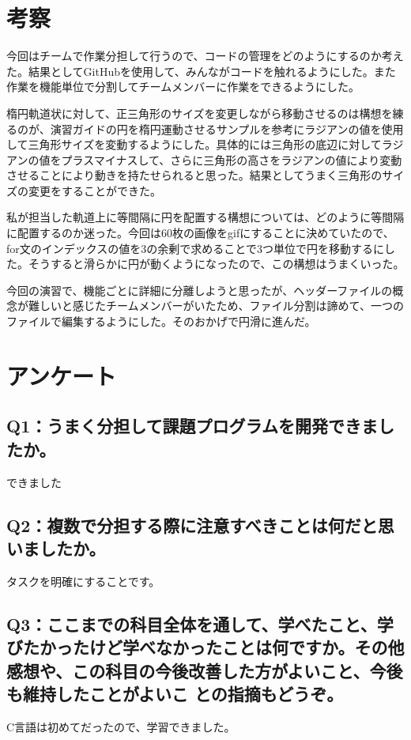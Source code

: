 \documentclass[12pt,a4j]{jarticle}
\begin{document}
\section{考察}

今回はチームで作業分担して行うので、コードの管理をどのようにするのか考えた。結果としてGitHubを使用して、みんながコードを触れるようにした。また作業を機能単位で分割してチームメンバーに作業をできるようにした。

楕円軌道状に対して、正三角形のサイズを変更しながら移動させるのは構想を練るのが、演習ガイドの円を楕円運動させるサンプルを参考にラジアンの値を使用して三角形サイズを変動するようにした。具体的には三角形の底辺に対してラジアンの値をプラスマイナスして、さらに三角形の高さをラジアンの値により変動させることにより動きを持たせられると思った。結果としてうまく三角形のサイズの変更をすることができた。

私が担当した軌道上に等間隔に円を配置する構想については、どのように等間隔に配置するのか迷った。今回は60枚の画像をgifにすることに決めていたので、for文のインデックスの値を3の余剰で求めることで3つ単位で円を移動するにした。そうすると滑らかに円が動くようになったので、この構想はうまくいった。

今回の演習で、機能ごとに詳細に分離しようと思ったが、ヘッダーファイルの概念が難しいと感じたチームメンバーがいたため、ファイル分割は諦めて、一つのファイルで編集するようにした。そのおかげで円滑に進んだ。

\section{アンケート}

\subsection{Q1：うまく分担して課題プログラムを開発できましたか。}

できました

\subsection{Q2：複数で分担する際に注意すべきことは何だと思いましたか。}

タスクを明確にすることです。

\subsection{Q3：ここまでの科目全体を通して、学べたこと、学びたかったけど学べなかったことは何ですか。その他感想や、この科目の今後改善した方がよいこと、今後も維持したことがよいこ との指摘もどうぞ。}

C言語は初めてだったので、学習できました。
\end{document}
